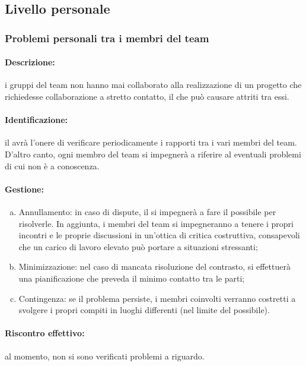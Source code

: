 \documentclass[../PianoProgetto.tex]{subfiles}
\begin{document}
\subsection{Livello personale}

\subsubsection{Problemi personali tra i membri del team}

	\paragraph*{Descrizione:} i gruppi del team non hanno mai collaborato alla realizzazione di un progetto che richiedesse collaborazione a stretto contatto, il che può causare attriti tra essi.
	
	\paragraph*{Identificazione:} il \responsabilediprogetto avrà l’onere di verificare periodicamente i rapporti tra i vari membri del team. D’altro canto, ogni membro del team si impegnerà a riferire al \responsabilediprogetto eventuali problemi di cui non è a conoscenza.
	
	\paragraph*{Gestione:}
	\begin{enumerate}[(a)]
		\item Annullamento: in caso di dispute, il \responsabilediprogetto si impegnerà a fare il possibile per risolverle. In aggiunta, i membri del team si impegneranno a tenere i propri incontri e le proprie discussioni in un’ottica di critica costruttiva, consapevoli che un carico di lavoro elevato può portare a situazioni stressanti;
		\item Minimizzazione: nel caso di mancata risoluzione del contrasto, si effettuerà una pianificazione che preveda il minimo contatto tra le parti; 
		\item Contingenza: se il problema persiste, i membri coinvolti verranno costretti a svolgere i propri compiti in luoghi differenti (nel limite del possibile).
	\end{enumerate}	
	
	\paragraph*{Riscontro effettivo:} al momento, non si sono verificati problemi a riguardo.
\end{document}
